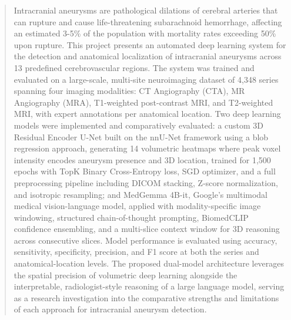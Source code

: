 \documentclass[twoside,a4paper,openright]{report} %
\begin{document}
\begin{abstract}

Intracranial aneurysms are pathological dilations of cerebral arteries that can rupture and cause life-threatening subarachnoid hemorrhage, affecting an estimated 3-5\% of the population with mortality rates exceeding 50\% upon rupture. This project presents an automated deep learning system for the detection and anatomical localization of intracranial aneurysms across 13 predefined cerebrovascular regions. The system was trained and evaluated on a large-scale, multi-site neuroimaging dataset of 4,348 series spanning four imaging modalities: CT Angiography (CTA), MR Angiography (MRA), T1-weighted post-contrast MRI, and T2-weighted MRI, with expert annotations per anatomical location. Two deep learning models were implemented and comparatively evaluated: a custom 3D Residual Encoder U-Net built on the nnU-Net framework using a blob regression approach, generating 14 volumetric heatmaps where peak voxel intensity encodes aneurysm presence and 3D location, trained for 1,500 epochs with TopK Binary Cross-Entropy loss, SGD optimizer, and a full preprocessing pipeline including DICOM stacking, Z-score normalization, and isotropic resampling; and MedGemma 4B-it, Google's multimodal medical vision-language model, applied with modality-specific image windowing, structured chain-of-thought prompting, BiomedCLIP confidence ensembling, and a multi-slice context window for 3D reasoning across consecutive slices. Model performance is evaluated using accuracy, sensitivity, specificity, precision, and F1 score at both the series and anatomical-location levels. The proposed dual-model architecture leverages the spatial precision of volumetric deep learning alongside the interpretable, radiologist-style reasoning of a large language model,  serving as a research investigation into the comparative strengths and limitations of each approach for intracranial aneurysm detection.
\end{abstract}
\newpage
\mbox{~}
\newpage
{}
\tableofcontents %


\listoffigures

\thispagestyle{empty} 
\end{document}

